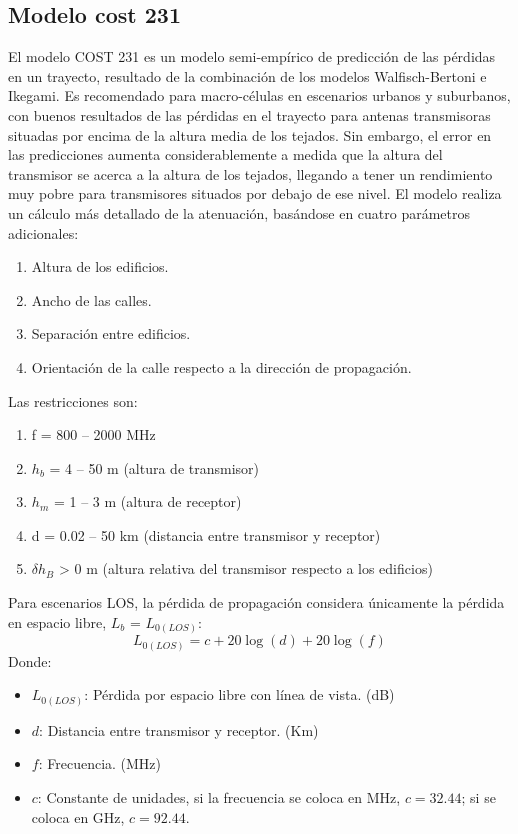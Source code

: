 \documentclass[
	12pt, %
	fleqn, %
	a4paper, %
	oneside, %
]{LegrandOrangeBook}
\begin{document}
\subsection{Modelo cost 231}
El modelo COST 231 es un modelo semi-empírico de predicción de las pérdidas en un trayecto, resultado de la combinación de los modelos Walfisch-Bertoni e Ikegami. Es recomendado para macro-células en escenarios urbanos y suburbanos, con buenos resultados de las pérdidas en el trayecto para antenas transmisoras situadas por encima de la altura media de los tejados. Sin embargo, el error en las predicciones aumenta considerablemente a medida que la altura del transmisor se acerca a la altura de los tejados, llegando a tener un rendimiento muy pobre para transmisores situados por debajo de ese nivel. El modelo realiza un cálculo más detallado de la atenuación, basándose en cuatro parámetros adicionales:
\begin{enumerate}
\item Altura de los edificios.
\item Ancho de las calles.
\item Separación entre edificios.
\item Orientación de la calle respecto a la dirección de propagación.
\end{enumerate}
Las restricciones son:
\begin{enumerate}
\item f = 800 – 2000 MHz
\item $h_b$ = 4 – 50 m (altura de transmisor)
\item $h_m$ = 1 – 3 m (altura de receptor)
\item d = 0.02 – 50 km (distancia entre transmisor y receptor)
\item $\delta h_B$ > 0 m (altura relativa del transmisor respecto a los edificios)
\end{enumerate}
Para escenarios LOS, la pérdida de propagación considera únicamente la pérdida en espacio libre, $L_b$ = $L_{0(LOS)}$:
\begin{equation}
L_{0(LOS)}=c+20\log(d)+20\log(f)
\label{eq:espacio libre los}
\end{equation}
Donde:
\begin{itemize}
\item $L_{0(LOS)}$: Pérdida por espacio libre con línea de vista. (dB)
\item $d$: Distancia entre transmisor y receptor. (Km)
\item $f$: Frecuencia. (MHz)
\item $c$: Constante de unidades, si la frecuencia se coloca en MHz, $c=32.44$; si se coloca en GHz, $c=92.44$.
\end{itemize}
\end{document}
